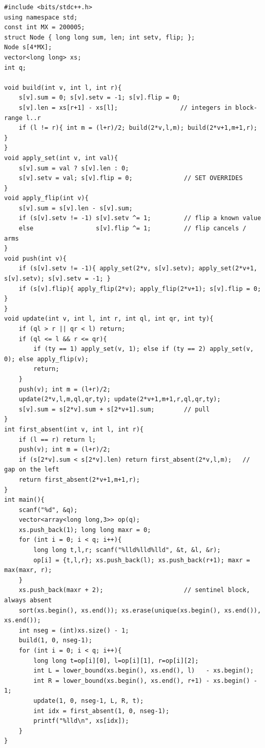 \begin{lstlisting}[caption={CF 817F full solution: assign/flip lazy over compressed blocks + leftmost-absent descend}, label={lst:c15-817-soln}]
#include <bits/stdc++.h>
using namespace std;
const int MX = 200005;
struct Node { long long sum, len; int setv, flip; };
Node s[4*MX];
vector<long long> xs;
int q;

void build(int v, int l, int r){
    s[v].sum = 0; s[v].setv = -1; s[v].flip = 0;
    s[v].len = xs[r+1] - xs[l];                 // integers in block-range l..r
    if (l != r){ int m = (l+r)/2; build(2*v,l,m); build(2*v+1,m+1,r); }
}
void apply_set(int v, int val){
    s[v].sum = val ? s[v].len : 0;
    s[v].setv = val; s[v].flip = 0;              // SET OVERRIDES
}
void apply_flip(int v){
    s[v].sum = s[v].len - s[v].sum;
    if (s[v].setv != -1) s[v].setv ^= 1;         // flip a known value
    else                 s[v].flip ^= 1;         // flip cancels / arms
}
void push(int v){
    if (s[v].setv != -1){ apply_set(2*v, s[v].setv); apply_set(2*v+1, s[v].setv); s[v].setv = -1; }
    if (s[v].flip){ apply_flip(2*v); apply_flip(2*v+1); s[v].flip = 0; }
}
void update(int v, int l, int r, int ql, int qr, int ty){
    if (ql > r || qr < l) return;
    if (ql <= l && r <= qr){
        if (ty == 1) apply_set(v, 1); else if (ty == 2) apply_set(v, 0); else apply_flip(v);
        return;
    }
    push(v); int m = (l+r)/2;
    update(2*v,l,m,ql,qr,ty); update(2*v+1,m+1,r,ql,qr,ty);
    s[v].sum = s[2*v].sum + s[2*v+1].sum;        // pull
}
int first_absent(int v, int l, int r){
    if (l == r) return l;
    push(v); int m = (l+r)/2;
    if (s[2*v].sum < s[2*v].len) return first_absent(2*v,l,m);   // gap on the left
    return first_absent(2*v+1,m+1,r);
}
int main(){
    scanf("%d", &q);
    vector<array<long long,3>> op(q);
    xs.push_back(1); long long maxr = 0;
    for (int i = 0; i < q; i++){
        long long t,l,r; scanf("%lld%lld%lld", &t, &l, &r);
        op[i] = {t,l,r}; xs.push_back(l); xs.push_back(r+1); maxr = max(maxr, r);
    }
    xs.push_back(maxr + 2);                      // sentinel block, always absent
    sort(xs.begin(), xs.end()); xs.erase(unique(xs.begin(), xs.end()), xs.end());
    int nseg = (int)xs.size() - 1;
    build(1, 0, nseg-1);
    for (int i = 0; i < q; i++){
        long long t=op[i][0], l=op[i][1], r=op[i][2];
        int L = lower_bound(xs.begin(), xs.end(), l)   - xs.begin();
        int R = lower_bound(xs.begin(), xs.end(), r+1) - xs.begin() - 1;
        update(1, 0, nseg-1, L, R, t);
        int idx = first_absent(1, 0, nseg-1);
        printf("%lld\n", xs[idx]);
    }
}
\end{lstlisting}

